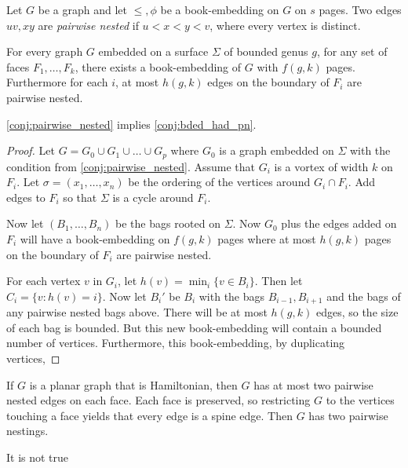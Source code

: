 


Let $G$ be a graph and let $\leq, \phi$ be a book-embedding on $G$ on $s$ pages. Two edges $uv, xy$ are \textit{pairwise nested} if $u < x < y < v$, where every vertex is distinct. 

\begin{conjecture}\label{conj:pairwise_nested}
    For every graph $G$ embedded on a surface $\Sigma$ of bounded genus $g$, for any set of faces $F_1, \ldots, F_k$, there exists a book-embedding of $G$ with $f(g, k)$ pages. Furthermore for each $i$, at most $h(g, k)$ edges on the boundary of $F_i$ are pairwise nested. 
\end{conjecture}

\cref{conj:pairwise_nested} implies \cref{conj:bded_had_pn}. 

\begin{proof}
    Let $G = G_0 \cup G_1 \cup \ldots \cup G_p$ where $G_0$ is a graph embedded on $\Sigma$ with the condition from \cref{conj:pairwise_nested}. Assume that $G_i$ is a vortex of width $k$ on $F_i$. Let $\sigma = (x_1, \ldots, x_n)$ be the ordering of the vertices around $G_i \cap F_i$. Add edges to $F_i$ so that $\Sigma$ is a cycle around $F_i$. 

    Now let $(B_1, \ldots, B_n)$ be the bags rooted on $\Sigma$. Now $G_0$ plus the edges added on $F_i$ will have a book-embedding on $f(g, k)$ pages where at most $h(g, k)$ pages on the boundary of $F_i$ are pairwise nested.

    For each vertex $v$ in $G_i$, let $h(v) = \min_i\{v \in B_i\}$. Then let $C_i = \{v : h(v) = i\}$. Now let $B_i'$ be $B_i$ with the bags $B_{i-1}, B_{i + 1}$ and the bags of any pairwise nested bags above. There will be at most $h(g, k)$ edges, so the size of each bag is bounded. But this new book-embedding will contain a bounded number of vertices. Furthermore, this book-embedding, by duplicating vertices, 
\end{proof}

If $G$ is a planar graph that is Hamiltonian, then $G$ has at most two pairwise nested edges on each face. Each face is preserved, so restricting $G$ to the vertices touching a face yields that every edge is a spine edge. Then $G$ has two pairwise nestings. 

It is not true 